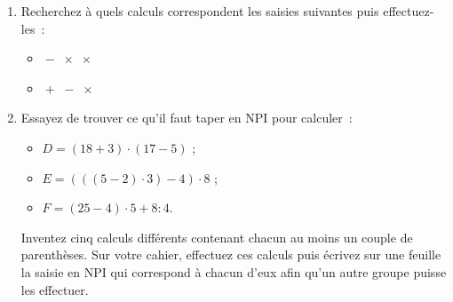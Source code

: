 \begin{TP}

\begin{enumerate}
 \item Recherchez à quels calculs correspondent les saisies suivantes puis effectuez-les :
   \begin{itemize} 
  
  \vspace{1em}
  
  \item {} \quad {} \quad {} \quad {} \quad $\boxed{-}$ \quad {} \quad {} \quad $\boxed{\times}$ \quad {} \quad {} \quad $\boxed{\times}$\\[-0.75em]
  \item {} \quad {} \quad {} \quad {} \quad $\boxed{+}$ \quad {} \quad {} \quad {} \quad {} \quad $\boxed{-}$ \quad $\boxed{\times}$
  \end{itemize}
  
  \vspace{1em}
  
 \item Essayez de trouver ce qu'il faut taper en NPI pour calculer : 
 \begin{itemize}
  \item $D = (18 + 3) \cdot (17 - 5)$ ;
  \item $E = (((5 - 2) \cdot 3) - 4) \cdot 8$ ;
  \item $F = (25 - 4) \cdot 5 + 8 : 4$.
  \end{itemize}
Inventez cinq calculs différents contenant chacun au moins un couple de parenthèses. Sur votre cahier, effectuez ces calculs puis écrivez sur une feuille la saisie en NPI qui correspond à chacun d'eux afin qu'un autre groupe puisse les effectuer.

 \end{enumerate}
 
\end{TP}

